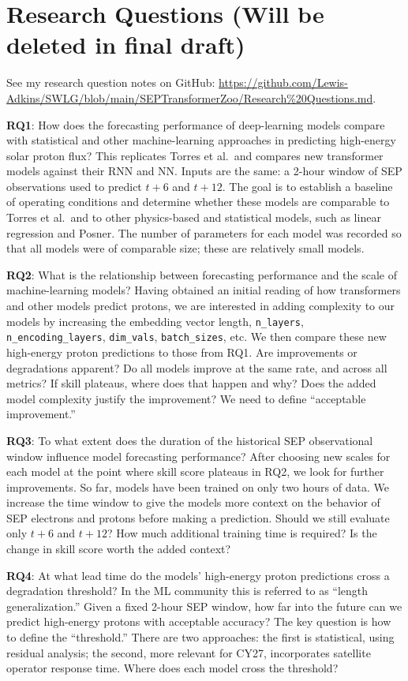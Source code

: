 \section*{Research Questions (Will be deleted in final draft)}

See my research question notes on GitHub: \url{https://github.com/Lewis-Adkins/SWLG/blob/main/SEPTransformerZoo/Research\%20Questions.md}.

\textbf{RQ1}: How does the forecasting performance of deep-learning models compare with statistical
and other machine-learning approaches in predicting high-energy solar proton flux?
This replicates Torres et al.\ and compares new transformer models against their RNN and NN.
Inputs are the same: a 2-hour window of SEP observations used to predict $t+6$ and $t+12$.
The goal is to establish a baseline of operating conditions and determine whether these models are comparable
to Torres et al.\ and to other physics-based and statistical models, such as linear regression and Posner.
The number of parameters for each model was recorded so that all models were of comparable size;
these are relatively small models.

\textbf{RQ2}: What is the relationship between forecasting performance and the scale of machine-learning models?
Having obtained an initial reading of how transformers and other models predict protons, we are interested in
adding complexity to our models by increasing the embedding vector length,
\texttt{n\_layers}, \texttt{n\_encoding\_layers}, \texttt{dim\_vals}, \texttt{batch\_sizes}, etc.
We then compare these new high-energy proton predictions to those from RQ1.
Are improvements or degradations apparent? Do all models improve at the same rate, and across all metrics?
If skill plateaus, where does that happen and why? Does the added model complexity justify the improvement?
We need to define ``acceptable improvement.''

\textbf{RQ3}: To what extent does the duration of the historical SEP observational window influence model forecasting performance?
After choosing new scales for each model at the point where skill score plateaus in RQ2, we look for further improvements.
So far, models have been trained on only two hours of data. We increase the time window to give the models more context
on the behavior of SEP electrons and protons before making a prediction.
Should we still evaluate only $t+6$ and $t+12$? How much additional training time is required?
Is the change in skill score worth the added context?

\textbf{RQ4}: At what lead time do the models' high-energy proton predictions cross a degradation threshold?
In the ML community this is referred to as ``length generalization.'' Given a fixed 2-hour SEP window,
how far into the future can we predict high-energy protons with acceptable accuracy?
The key question is how to define the ``threshold.'' There are two approaches: the first is statistical,
using residual analysis; the second, more relevant for CY27, incorporates satellite operator response time.
Where does each model cross the threshold?
